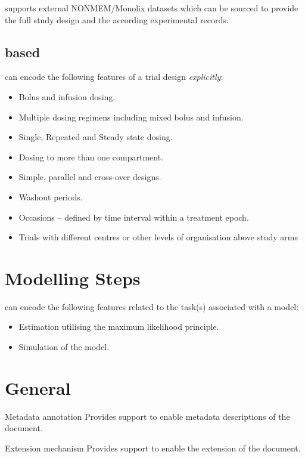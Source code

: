 \pharmml supports external NONMEM/Monolix datasets which can be sourced 
to provide the full study design and the according experimental records. 
 
\subsection{ based}

\pharmml can encode the following features of a trial design \emph{explicitly}:
\begin{itemize}
\item{Bolus and infusion dosing.}
\item{Multiple dosing regimens including mixed bolus and infusion.}
\item{Single, Repeated and Steady state dosing.}
\item{Dosing to more than one compartment.}
\item{Simple, parallel and cross-over designs.}
\item{Washout periods.}
\item{Occasions -- defined by time interval within a treatment epoch.}
\item{Trials with different centres or other levels of organisation above study arms}
\end{itemize}

\section{Modelling Steps}

\pharmml can encode the following features related to the task(s) associated with a model:
\begin{itemize}
\item{Estimation utilising the maximum likelihood principle.}
\item{Simulation of the model.}
\end{itemize}

\section{General}

\begin{description}
\item{Metadata annotation} Provides support to enable metadata
descriptions of the \pharmml document.
\item{Extension mechanism} Provides support to enable the extension of
the \pharmml document.
\end{description}

